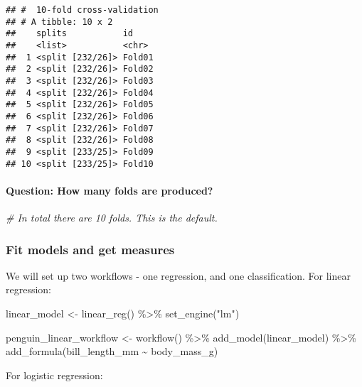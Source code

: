 \documentclass[
]{article}
\newenvironment{Shaded}{\begin{snugshade}}{\end{snugshade}}
\newcommand{\CommentTok}[1]{\textcolor[rgb]{0.56,0.35,0.01}{\textit{#1}}}
\newcommand{\FunctionTok}[1]{\textcolor[rgb]{0.00,0.00,0.00}{#1}}
\newcommand{\NormalTok}[1]{#1}
\newcommand{\OtherTok}[1]{\textcolor[rgb]{0.56,0.35,0.01}{#1}}
\newcommand{\SpecialCharTok}[1]{\textcolor[rgb]{0.00,0.00,0.00}{#1}}
\newcommand{\StringTok}[1]{\textcolor[rgb]{0.31,0.60,0.02}{#1}}
\begin{document}
\begin{verbatim}
## #  10-fold cross-validation 
## # A tibble: 10 x 2
##    splits           id    
##    <list>           <chr> 
##  1 <split [232/26]> Fold01
##  2 <split [232/26]> Fold02
##  3 <split [232/26]> Fold03
##  4 <split [232/26]> Fold04
##  5 <split [232/26]> Fold05
##  6 <split [232/26]> Fold06
##  7 <split [232/26]> Fold07
##  8 <split [232/26]> Fold08
##  9 <split [233/25]> Fold09
## 10 <split [233/25]> Fold10
\end{verbatim}

\hypertarget{question-how-many-folds-are-produced}{%
\paragraph{Question: How many folds are
produced?}\label{question-how-many-folds-are-produced}}

\begin{Shaded}
\begin{Highlighting}[]
\CommentTok{\# In total there are 10 folds. This is the default.}
\end{Highlighting}
\end{Shaded}

\hypertarget{fit-models-and-get-measures}{%
\subsubsection{Fit models and get
measures}\label{fit-models-and-get-measures}}

We will set up two workflows - one regression, and one classification.
For linear regression:

\begin{Shaded}
\begin{Highlighting}[]
\NormalTok{linear\_model }\OtherTok{\textless{}{-}} \FunctionTok{linear\_reg}\NormalTok{() }\SpecialCharTok{\%\textgreater{}\%} 
  \FunctionTok{set\_engine}\NormalTok{(}\StringTok{"lm"}\NormalTok{)}

\NormalTok{penguin\_linear\_workflow }\OtherTok{\textless{}{-}} \FunctionTok{workflow}\NormalTok{() }\SpecialCharTok{\%\textgreater{}\%} 
  \FunctionTok{add\_model}\NormalTok{(linear\_model) }\SpecialCharTok{\%\textgreater{}\%} 
  \FunctionTok{add\_formula}\NormalTok{(bill\_length\_mm }\SpecialCharTok{\textasciitilde{}}\NormalTok{ body\_mass\_g)}
\end{Highlighting}
\end{Shaded}

For logistic regression:
\end{document}
